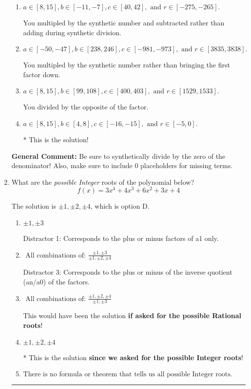\documentclass{extbook}[14pt]
\newcommand{\litem}[1]{\item #1

\rule{\textwidth}{0.4pt}}
\begin{document}
\begin{enumerate}
{\begin{enumerate}[label=\Alph*.]
 You divided by the opposite of the factor AND multipled the first factor rather than just bringing it down.
\item \( a \in [8, 15], b \in [-11, -7], c \in [40, 42], \text{ and } r \in [-275, -265]. \)

 You multipled by the synthetic number and subtracted rather than adding during synthetic division.
\item \( a \in [-50, -47], b \in [238, 246], c \in [-981, -973], \text{ and } r \in [3835, 3838]. \)

 You multipled by the synthetic number rather than bringing the first factor down.
\item \( a \in [8, 15], b \in [99, 108], c \in [400, 403], \text{ and } r \in [1529, 1533]. \)

 You divided by the opposite of the factor.
\item \( a \in [8, 15], b \in [4, 8], c \in [-16, -15], \text{ and } r \in [-5, 0]. \)

* This is the solution!
\end{enumerate}

\textbf{General Comment:} Be sure to synthetically divide by the zero of the denominator! Also, make sure to include 0 placeholders for missing terms.
}
\litem{
What are the \textit{possible Integer} roots of the polynomial below?
\[ f(x) = 3x^{4} +4 x^{3} +6 x^{2} +3 x + 4 \]

The solution is \( \pm 1,\pm 2,\pm 4 \), which is option D.\begin{enumerate}[label=\Alph*.]
\item \( \pm 1,\pm 3 \)

 Distractor 1: Corresponds to the plus or minus factors of a1 only.
\item \( \text{ All combinations of: }\frac{\pm 1,\pm 3}{\pm 1,\pm 2,\pm 4} \)

 Distractor 3: Corresponds to the plus or minus of the inverse quotient (an/a0) of the factors. 
\item \( \text{ All combinations of: }\frac{\pm 1,\pm 2,\pm 4}{\pm 1,\pm 3} \)

This would have been the solution \textbf{if asked for the possible Rational roots}!
\item \( \pm 1,\pm 2,\pm 4 \)

* This is the solution \textbf{since we asked for the possible Integer roots}!
\item \( \text{There is no formula or theorem that tells us all possible Integer roots.} \)


\end{enumerate}}
\end{enumerate}
\end{document}
